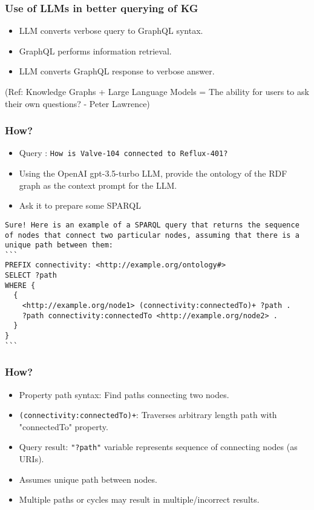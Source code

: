 \begin{frame}[fragile]\frametitle{Use of LLMs in better querying of KG}

\begin{itemize}
\item LLM converts verbose query to GraphQL syntax.
\item GraphQL performs information retrieval.
\item LLM converts GraphQL response to verbose answer.
\end{itemize}

	
{\tiny (Ref: Knowledge Graphs + Large Language Models = The ability for users to ask their own questions? - Peter Lawrence)}

\end{frame}

\begin{frame}[fragile]\frametitle{How?}

\begin{itemize}
\item Query : \lstinline|How is Valve-104 connected to Reflux-401?|
\item Using the OpenAI gpt-3.5-turbo LLM, provide the ontology of the RDF graph as the context prompt for the LLM.
\item Ask it to prepare some SPARQL
\end{itemize}	

\begin{lstlisting}
Sure! Here is an example of a SPARQL query that returns the sequence of nodes that connect two particular nodes, assuming that there is a unique path between them:
```
PREFIX connectivity: <http://example.org/ontology#>
SELECT ?path
WHERE {
  {
    <http://example.org/node1> (connectivity:connectedTo)+ ?path .
    ?path connectivity:connectedTo <http://example.org/node2> .
  }
}
```
\end{lstlisting}

\end{frame}

\begin{frame}[fragile]\frametitle{How?}

\begin{itemize}
\item Property path syntax: Find paths connecting two nodes.
\item \lstinline|(connectivity:connectedTo)+|: Traverses arbitrary length path with "connectedTo" property.
\item Query result: \lstinline|"?path"| variable represents sequence of connecting nodes (as URIs).
\item Assumes unique path between nodes.
\item Multiple paths or cycles may result in multiple/incorrect results.
\end{itemize}	

\end{frame}


